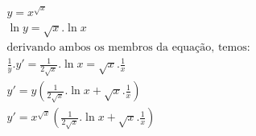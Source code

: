 \begin{ex}
\begin{align}
&y=x^{\sqrt{x}}\nonumber\\
&\ln{y}=\sqrt{x}.\ln{x}\nonumber\\
&\text{derivando ambos os membros da equação, temos:}\nonumber\\
&\frac{1}{y}.y'=\frac{1}{2\sqrt{x}}.\ln{x}=\sqrt{x}.\frac{1}{x}\nonumber\\
&y'=y\left(\frac{1}{2\sqrt{x}}.\ln{x}+\sqrt{x}.\frac{1}{x}\right)\nonumber\\
&y'=x^{\sqrt{x}}\left(\frac{1}{2\sqrt{x}}.\ln{x}+\sqrt{x}.\frac{1}{x}\right)\nonumber
\end{align}
\end{ex}